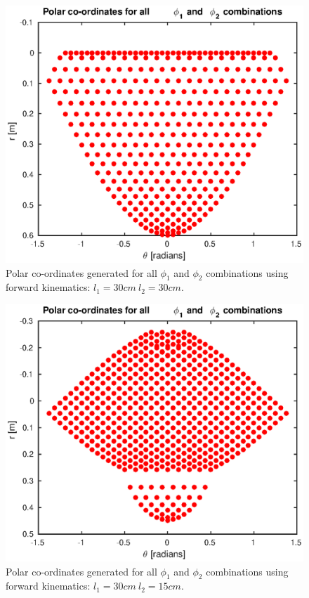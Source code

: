 \begin{figure}
\centering
\includegraphics[width=1\textwidth]{images/geometry/forward-kinematic-leg-positions-30-30.eps}
\caption{Polar co-ordinates generated for all $\phi_1$ and $\phi_2$ combinations using forward kinematics: $l_1 = 30cm\ l_2 = 30cm$.}
\label{fig:Polar co-ordinates generated 30-30}
\end{figure}

\begin{figure}
\centering
\includegraphics[width=1\textwidth]{images/geometry/forward-kinematic-leg-positions-30-15-complex.eps}
\caption{Polar co-ordinates generated for all $\phi_1$ and $\phi_2$ combinations using forward kinematics: $l_1 = 30cm\ l_2 = 15cm$.}
\label{fig:Polar co-ordinates generated 30-15}
\end{figure}